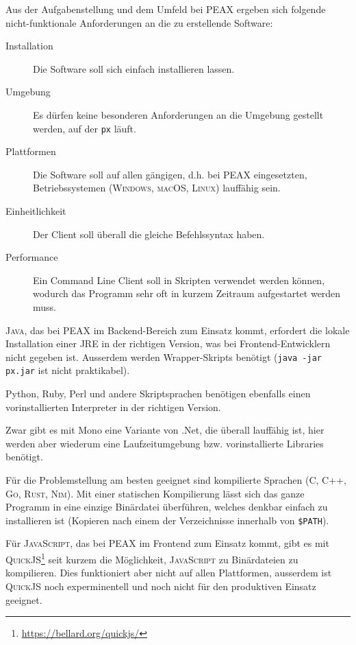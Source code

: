 Aus der Aufgabenstellung und dem Umfeld bei PEAX ergeben sich folgende nicht-funktionale Anforderungen an die zu erstellende Software:

\begin{description}
    \item[Installation] Die Software soll sich einfach installieren lassen.
    \item[Umgebung] Es dürfen keine besonderen Anforderungen an die Umgebung gestellt werden, auf der \texttt{px} läuft.
    \item[Plattformen] Die Software soll auf allen gängigen, d.h. bei PEAX eingesetzten, Betriebssystemen (\textsc{Windows}, \textsc{macOS}, \textsc{Linux}) lauffähig sein.
    \item[Einheitlichkeit] Der Client soll überall die gleiche Befehlssyntax haben.
    \item[Performance] Ein Command Line Client soll in Skripten verwendet werden können, wodurch das Programm sehr oft in kurzem Zeitraum aufgestartet werden muss.
\end{description}

\textsc{Java}, das bei PEAX im Backend-Bereich zum Einsatz kommt, erfordert die lokale Installation einer JRE in der richtigen Version, was bei Frontend-Entwicklern nicht gegeben ist. Ausserdem werden Wrapper-Skripts benötigt (\texttt{java -jar px.jar} ist nicht praktikabel).

Python, Ruby, Perl und andere Skriptsprachen benötigen ebenfalls einen vorinstallierten Interpreter in der richtigen Version.

Zwar gibt es mit Mono eine Variante von .Net, die überall lauffähig ist, hier werden aber wiederum eine Laufzeitumgebung bzw. vorinstallierte Libraries benötigt.

Für die Problemstellung am besten geeignet sind kompilierte Sprachen (C, C++, \textsc{Go}, \textsc{Rust}, \textsc{Nim}). Mit einer statischen Kompilierung lässt sich das ganze Programm in eine einzige Binärdatei überführen, welches denkbar einfach zu installieren ist (Kopieren nach einem der Verzeichnisse innerhalb von \texttt{\$PATH}).

Für \textsc{JavaScript}, das bei PEAX im Frontend zum Einsatz kommt, gibt es mit \textsc{QuickJS}\footnote{\url{https://bellard.org/quickjs/}} seit kurzem die Möglichkeit, \textsc{JavaScript} zu Binärdateien zu kompilieren. Dies funktioniert aber nicht auf allen Plattformen, ausserdem ist \textsc{QuickJS} noch experminentell und noch nicht für den produktiven Einsatz geeignet.

